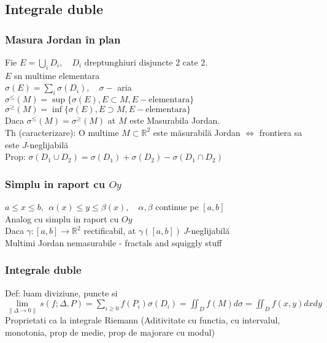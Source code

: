 \documentclass{article}
\newcommand*{\R}{\mathbb{R}}
\begin{document}
\subsection*{Integrale duble}
\subsubsection*{Masura Jordan în plan}
Fie $E = \bigcup_i D_i, \quad D_i \text{ dreptunghiuri disjuncte 2 cate 2}$.\\
$E$ sn multime elementara\\
$\sigma(E) = \sum_i \sigma(D_i), \quad \sigma - $ aria\\
$\sigma^{\le}(M)=\sup\{\sigma(E), E \subset M, E -\text{elementara} \}$\\
$\sigma^{\ge}(M)=\inf\{\sigma(E), E \supset M, E -\text{elementara} \}$\\
Daca $\sigma^{\le}(M)=\sigma^{\ge}(M) $ at $M$ este Masurabila Jordan.\\
Th (caracterizare): O multime $M \subset \R^2$ este măsurabilă Jordan $\iff$ frontiera sa este $J$-neglijabilă\\
Prop: $\sigma(D_1\cup D_2) = \sigma(D_1) + \sigma(D_2) - \sigma(D_1\cap D_2)$
\subsubsection*{Simplu in raport cu $Oy$}
$ a\le x \le b,\ \ \alpha(x)\le y \le \beta(x), \quad \alpha, \beta $ continue pe $[a, b]$ \\
Analog cu simplu in raport cu $Oy$\\
Daca $\gamma: [a, b] \to \R^2$ rectificabil, at $\gamma([a, b])\ J$-neglijabilă\\
Multimi Jordan nemasurabile - fractals and squiggly stuff
\subsubsection*{Integrale duble}
Def: luam diviziune, puncte si $\displaystyle \lim\limits_{\|\Delta\to 0\|}s(f;\Delta, P) = \sum_{i\ge 0} f(P_i)\sigma(D_i)=\iint_Df(M)d\sigma=\iint_Df(x,y)dxdy$\\
Proprietati ca la integrale Riemann
(Aditivitate cu functia, cu intervalul, monotonia, prop de medie, prop de majorare cu modul)
\end{document}
